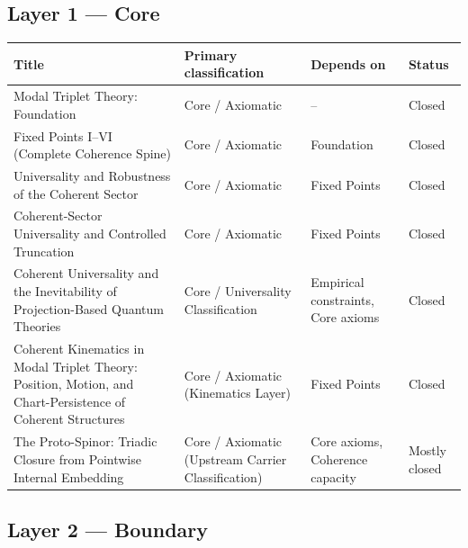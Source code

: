 \documentclass[11pt]{article}
\begin{document}
\subsection{Layer 1 --- Core}

\begin{center}
\small
\begin{tabular}{|p{7.2cm}|p{3.6cm}|p{3.6cm}|p{1.6cm}|}
\hline
\textbf{Title} & \textbf{Primary classification} & \textbf{Depends on} & \textbf{Status}\\
\hline
Modal Triplet Theory: Foundation
& Core / Axiomatic & -- & Closed\\
\hline
Fixed Points I--VI (Complete Coherence Spine)
& Core / Axiomatic & Foundation & Closed\\
\hline
Universality and Robustness of the Coherent Sector
& Core / Axiomatic & Fixed Points & Closed\\
\hline
Coherent-Sector Universality and Controlled Truncation
& Core / Axiomatic & Fixed Points & Closed\\
\hline
Coherent Universality and the Inevitability of Projection-Based Quantum Theories
& Core / Universality Classification
& Empirical constraints, Core axioms
& Closed\\
\hline
Coherent Kinematics in Modal Triplet Theory: Position, Motion, and Chart-Persistence of Coherent Structures
& Core / Axiomatic (Kinematics Layer) & Fixed Points & Closed \\
\hline
The Proto-Spinor: Triadic Closure from Pointwise Internal Embedding
& Core / Axiomatic (Upstream Carrier Classification)
& Core axioms, Coherence capacity
& Mostly closed \\
\hline
\end{tabular}
\end{center}

\subsection{Layer 2 --- Boundary}
\end{document}
